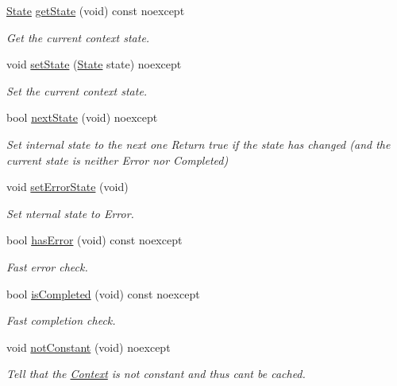 \begin{DoxyCompactItemize}
\mbox{\hyperlink{namespaceo_z_a356b278f7c65def0cae75fca8cae268e}{State}} \mbox{\hyperlink{classo_z_1_1_context_af912acc5fa475aa1e835a71df1752ef5}{get\+State}} (void) const noexcept
\begin{DoxyCompactList}\small\item\em Get the current context\textquotesingle{} state. \end{DoxyCompactList}\item 
void \mbox{\hyperlink{classo_z_1_1_context_ad64db4a4b4391e8b765338cc227f948b}{set\+State}} (\mbox{\hyperlink{namespaceo_z_a356b278f7c65def0cae75fca8cae268e}{State}} state) noexcept
\begin{DoxyCompactList}\small\item\em Set the current context\textquotesingle{} state. \end{DoxyCompactList}\item 
bool \mbox{\hyperlink{classo_z_1_1_context_aa07d51de7059b3a4fc9e3505704a33be}{next\+State}} (void) noexcept
\begin{DoxyCompactList}\small\item\em Set internal state to the next one Return true if the state has changed (and the current state is neither Error nor Completed) \end{DoxyCompactList}\item 
void \mbox{\hyperlink{classo_z_1_1_context_a036d993634650ee8414c2f12d49d0204}{set\+Error\+State}} (void)
\begin{DoxyCompactList}\small\item\em Set nternal state to Error. \end{DoxyCompactList}\item 
bool \mbox{\hyperlink{classo_z_1_1_context_a53afdf1400b5ec8429b09da40662a34d}{has\+Error}} (void) const noexcept
\begin{DoxyCompactList}\small\item\em Fast error check. \end{DoxyCompactList}\item 
bool \mbox{\hyperlink{classo_z_1_1_context_ac5dd957a1f76f466b86a179ed3146967}{is\+Completed}} (void) const noexcept
\begin{DoxyCompactList}\small\item\em Fast completion check. \end{DoxyCompactList}\item 
void \mbox{\hyperlink{classo_z_1_1_context_ada521ec57fbc2febfd61177e8bbc0128}{not\+Constant}} (void) noexcept
\begin{DoxyCompactList}\small\item\em Tell that the \mbox{\hyperlink{classo_z_1_1_context}{Context}} is not constant and thus can\textquotesingle{}t be cached. \end{DoxyCompactList}\item 

\end{DoxyCompactItemize}
